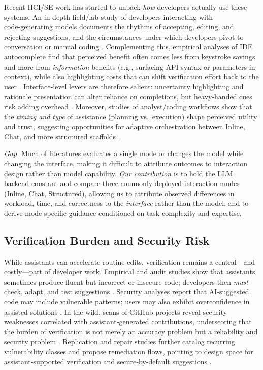 \documentclass[sigconf]{acmart}
\begin{document}
Recent HCI/SE work has started to unpack \emph{how} developers actually use these systems. An in‑depth field/lab study of developers interacting with code‑generating models documents the rhythms of accepting, editing, and rejecting suggestions, and the circumstances under which developers pivot to conversation or manual coding \cite{barke2023groundedcopilot}. Complementing this, empirical analyses of IDE autocomplete find that perceived benefit often comes less from keystroke savings and more from \emph{information} benefits (e.g., surfacing API syntax or parameters in context), while also highlighting costs that can shift verification effort back to the user \cite{jiang2024analysis}. Interface‑level levers are therefore salient: uncertainty highlighting and rationale presentation can alter reliance on completions, but heavy‑handed cues risk adding overhead \cite{vasconcelos2025generation}. Moreover, studies of analyst/coding workflows show that the \emph{timing and type} of assistance (planning vs.\ execution) shape perceived utility and trust, suggesting opportunities for adaptive orchestration between Inline, Chat, and more structured scaffolds \cite{gu2024wizard,zhong2024can}.

\emph{Gap.} Much of literatures evaluates a single mode or changes the model while changing the interface, making it difficult to attribute outcomes to interaction design rather than model capability. \emph{Our contribution} is to hold the LLM backend constant and compare three commonly deployed interaction modes (Inline, Chat, Structured), allowing us to attribute observed differences in workload, time, and correctness to the \emph{interface} rather than the model, and to derive mode‑specific guidance conditioned on task complexity and expertise.

\subsection{Verification Burden and Security Risk}
While assistants can accelerate routine edits, verification remains a central—and costly—part of developer work. Empirical and audit studies show that assistants sometimes produce fluent but incorrect or insecure code; developers then \emph{must} check, adapt, and test suggestions \cite{vaithilingam2022expectation,asare2024user}. Security analyses report that AI‑suggested code may include vulnerable patterns; users may also exhibit overconfidence in assisted solutions \cite{pearce2025asleep,perry2023users}. In the wild, scans of GitHub projects reveal security weaknesses correlated with assistant‑generated contributions, underscoring that the burden of verification is not merely an accuracy problem but a reliability and security problem \cite{fu2025security}. Replication and repair studies further catalog recurring vulnerability classes and propose remediation flows, pointing to design space for assistant‑supported verification and secure‑by‑default suggestions \cite{majdinasab2024assessing}. 
\end{document}
